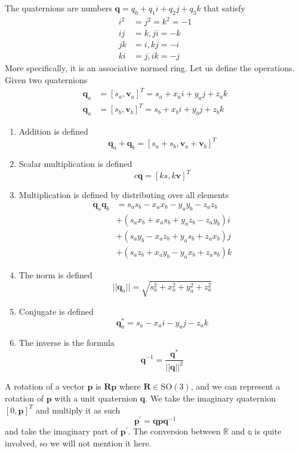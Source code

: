 \documentclass{article}
\theoremstyle{definition}
\theoremstyle{remark}
\theoremstyle{definition}
\begin{document}
The quaternions are numbers $\mathbf{q} = q_0 + q_1 i + q_2 j + q_3 k$ that satisfy 
\begin{align*}
    i^2 &= j^2 = k^2 = -1 \\
    ij &= k, ji = -k \\
    jk &= i, kj = -i \\
    ki &= j, ik = -j 
\end{align*}
More specifically, it is an associative normed ring. Let us define the operations. Given two quaternions 
\begin{align*}
    \mathbf{q}_a & = [s_a, \mathbf{v}_a]^T = s_a + x_a i + y_a j + z_a k \\
    \mathbf{q}_a & = [s_b, \mathbf{v}_b]^T = s_b + x_b i + y_b j + z_b k 
\end{align*}
\begin{enumerate}
    \item Addition is defined 
    \[\mathbf{q}_a + \mathbf{q}_b = [s_a + s_b, \mathbf{v}_a + \mathbf{v}_b]^T\]
    
    \item Scalar multiplication is defined 
    \[c \mathbf{q}= [k s, k\mathbf{v}]^T\]
    
    \item Multiplication is defined by distributing over all elements
    \begin{align*}
    \mathbf{q}_a \mathbf{q}_b & = s_a s_b - x_a x_b - y_a y_b - z_a z_b \\
    & + (s_a x_b + x_a s_b + y_a z_b - z_a y_b) i \\
    & + (s_a y_b - x_a z_b + y_a s_b + z_a x_b) j \\
    & + (s_a z_b + x_a y_b - y_a x_b + z_a s_b) k 
    \end{align*}
    
    \item The norm is defined 
    \[||\mathbf{q}_a || = \sqrt{s_a^2 + x_a^2 + y_a^2 + z_a^2}\]
    
    \item Conjugate is defined 
    \[\mathbf{q}_a^{*} = s_a - x_a i - y_a j - z_a k\]
    
    \item The inverse is the formula 
    \[\mathbf{q}^{-1} = \frac{\mathbf{q}^*}{||\mathbf{q}||^2}\]
\end{enumerate}
A rotation of a vector $\mathbf{p}$ is $\mathbf{R}\mathbf{p}$ where $\mathbf{R} \in \mathrm{SO}(3)$, and we can represent a rotation of $\mathbf{p}$ with a unit quaternion $\mathbf{q}$. We take the imaginary quaternion $[0, \mathbf{p}]^T$ and multiply it as such
\[\mathbf{p}^\prime = \mathbf{q} \mathbf{p} \mathbf{q}^{-1}\]
and take the imaginary part of $\mathbf{p}^\prime$. The conversion between $\mathbb{R}$ and $\mathbb{q}$ is quite involved, so we will not mention it here. 
\end{document}
